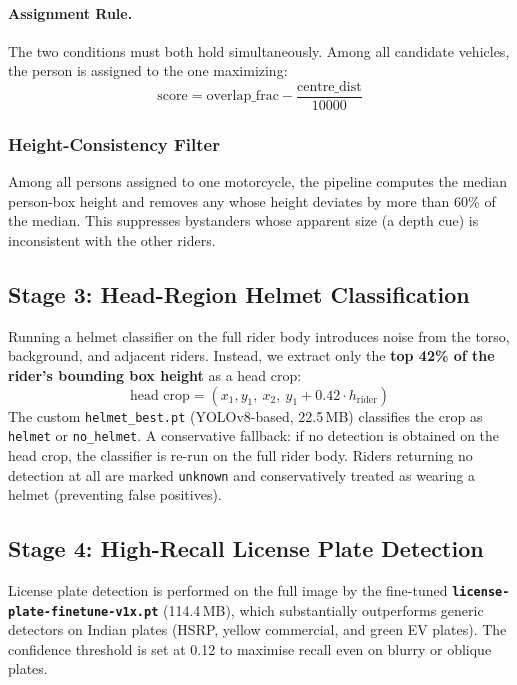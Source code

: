 \documentclass[12pt,a4paper]{article}
\begin{document}
\paragraph{Assignment Rule.}
The two conditions must both hold simultaneously. Among all candidate vehicles, the person
is assigned to the one maximizing:
\[
  \text{score} = \text{overlap\_frac} - \frac{\text{centre\_dist}}{10000}
\]

\subsubsection{Height-Consistency Filter}
Among all persons assigned to one motorcycle, the pipeline computes the median person-box
height and removes any whose height deviates by more than 60\% of the median. This
suppresses bystanders whose apparent size (a depth cue) is inconsistent with the other
riders.

\subsection{Stage 3: Head-Region Helmet Classification}

Running a helmet classifier on the full rider body introduces noise from the torso,
background, and adjacent riders. Instead, we extract only the \textbf{top 42\% of the
rider's bounding box height} as a head crop:
\[
  \text{head crop} = (x_1, y_1,\ x_2,\ y_1 + 0.42 \cdot h_{\text{rider}})
\]
The custom \texttt{helmet\_best.pt} (YOLOv8-based, 22.5\,MB) classifies the crop as
\texttt{helmet} or \texttt{no\_helmet}. A conservative fallback: if no detection is
obtained on the head crop, the classifier is re-run on the full rider body. Riders
returning no detection at all are marked \texttt{unknown} and conservatively treated as
wearing a helmet (preventing false positives).

\subsection{Stage 4: High-Recall License Plate Detection}

License plate detection is performed on the full image by the fine-tuned
\textbf{\texttt{license-plate-finetune-v1x.pt}} (114.4\,MB), which substantially
outperforms generic detectors on Indian plates (HSRP, yellow commercial, and green
EV plates). The confidence threshold is set at 0.12 to maximise recall even on blurry
or oblique plates.
\end{document}
